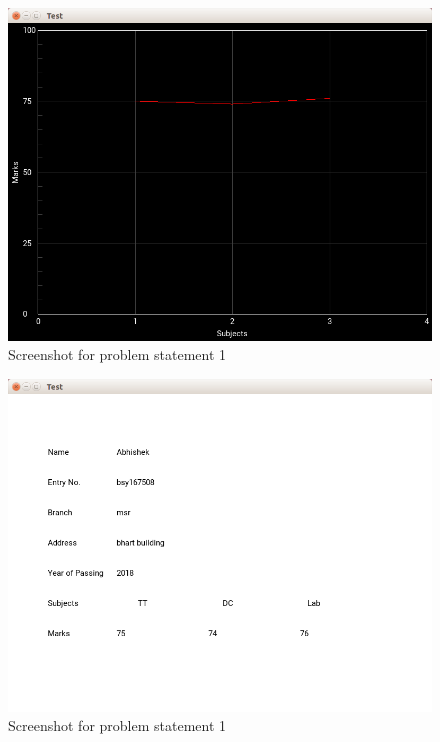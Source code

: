 \documentclass[11pt]{report}
\begin{document}
	\begin{figure}[h!]
	\centering
	\includegraphics[scale=0.8, center]{images/screenshot3}
	\caption{Screenshot for problem statement 1}
	\end{figure}
	\begin{figure}[h!]
	\centering
	\includegraphics[scale=0.8, center]{images/screenshot4}
	\caption{Screenshot for problem statement 1}
	\end{figure}
\end{document}
